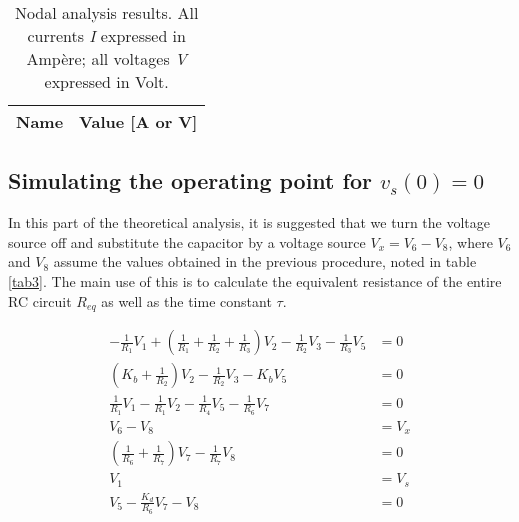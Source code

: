\begin{table}[h]                             

\centering                                  %
                        
\def\arraystretch{1.2}                       %
\begin{tabular}{c|c}                    %
\hline                                  %

\textbf{Name}  & \textbf{Value [A or V]}\\     

\hline                                %

\hline                                %
\end{tabular}   

\caption{Nodal analysis results. All currents \textit{I} expressed in Ampère; all voltages \textit{V} expressed in Volt.}
\label{tab2}   
\end{table}                             
\FloatBarrier

\subsection{Simulating the operating point for $v_s(0)=0$}\label{sec2.2}

In this part of the theoretical analysis, it is suggested that we turn the voltage source off and substitute the capacitor by a voltage source $V_x = V_6-V_8$, where $V_6$ and $V_8$ assume the values obtained in the previous procedure, noted in table \ref{tab3}. The main use of this is to calculate the equivalent resistance of the entire RC circuit $R_{eq}$ as well as the time constant $\tau$.

\begin{equation} \label{eq3}
\begin{split}
-\frac{1}{R_1}V_1+\left(\frac{1}{R_1}+\frac{1}{R_2}+\frac{1}{R_3}\right)V_2-\frac{1}{R_2}V_3-\frac{1}{R_3}V_5&=0\\
\left(K_b+\frac{1}{R_2}\right)V_2-\frac{1}{R_2}V_3-K_b V_5&=0\\
\frac{1}{R_1}V_1-\frac{1}{R_1}V_2-\frac{1}{R_4}V_5-\frac{1}{R_6}V_7&=0\\
V_6-V_8&=V_x\\
\left(\frac{1}{R_6}+\frac{1}{R_7}\right)V_7-\frac{1}{R_7}V_8&=0\\
V_1&=V_s \\
V_5-\frac{K_d}{R_6}V_7-V_8&=0
\end{split}
\end{equation}

